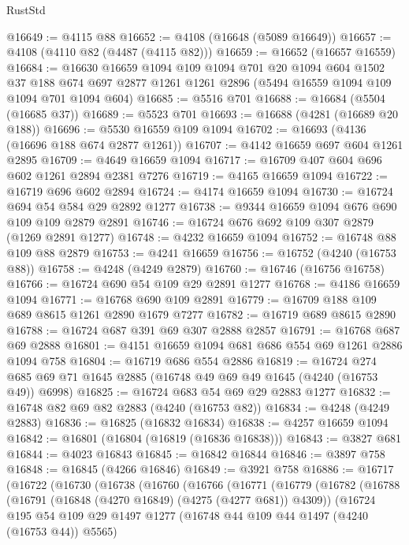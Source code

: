 \begin{lexlean}{RustStd}
\begin{coremodule}
@16649 := @4115 @88
@16652 := @4108 (@16648 (@5089 @16649))
@16657 := @4108 (@4110 @82 (@4487 (@4115 @82)))
@16659 := @16652 (@16657 @16559)
@16684 := @16630
    @16659
    @1094
    @109
    @1094
    @701
    @20
    @1094
    @604
    @1502
    @37
    @188
    @674
    @697
    @2877
    @1261
    @1261
    @2896
    (@5494 @16559 @1094 @109 @1094 @701 @1094 @604)
@16685 := @5516 @701
@16688 := @16684 (@5504 (@16685 @37))
@16689 := @5523 @701
@16693 := @16688 (@4281 (@16689 @20 @188))
@16696 := @5530 @16559 @109 @1094
@16702 := @16693 (@4136 (@16696 @188 @674 @2877 @1261))
@16707 := @4142 @16659 @697 @604 @1261 @2895
@16709 := @4649 @16659 @1094
@16717 := @16709 @407 @604 @696 @602 @1261 @2894 @2381 @7276
@16719 := @4165 @16659 @1094
@16722 := @16719 @696 @602 @2894
@16724 := @4174 @16659 @1094
@16730 := @16724 @694 @54 @584 @29 @2892 @1277
@16738 := @9344 @16659 @1094 @676 @690 @109 @109 @2879 @2891
@16746 := @16724 @676 @692 @109 @307 @2879 (@1269 @2891 @1277)
@16748 := @4232 @16659 @1094
@16752 := @16748 @88 @109 @88 @2879
@16753 := @4241 @16659
@16756 := @16752 (@4240 (@16753 @88))
@16758 := @4248 (@4249 @2879)
@16760 := @16746 (@16756 @16758)
@16766 := @16724 @690 @54 @109 @29 @2891 @1277
@16768 := @4186 @16659 @1094
@16771 := @16768 @690 @109 @2891
@16779 := @16709 @188 @109 @689 @8615 @1261 @2890 @1679 @7277
@16782 := @16719 @689 @8615 @2890
@16788 := @16724 @687 @391 @69 @307 @2888 @2857
@16791 := @16768 @687 @69 @2888
@16801 := @4151 @16659 @1094 @681 @686 @554 @69 @1261 @2886 @1094 @758
@16804 := @16719 @686 @554 @2886
@16819 := @16724 @274 @685 @69 @71 @1645 @2885 (@16748 @49 @69 @49 @1645 (@4240 (@16753 @49)) @6998)
@16825 := @16724 @683 @54 @69 @29 @2883 @1277
@16832 := @16748 @82 @69 @82 @2883 (@4240 (@16753 @82))
@16834 := @4248 (@4249 @2883)
@16836 := @16825 (@16832 @16834)
@16838 := @4257 @16659 @1094
@16842 := @16801 (@16804 (@16819 (@16836 @16838)))
@16843 := @3827 @681
@16844 := @4023 @16843
@16845 := @16842 @16844
@16846 := @3897 @758
@16848 := @16845 (@4266 @16846)
@16849 := @3921 @758
@16886 := @16717
    (@16722
      (@16730
        (@16738
          (@16760
            (@16766
              (@16771
                (@16779
                  (@16782
                    (@16788
                      (@16791 (@16848 (@4270 @16849) (@4275 (@4277 @681)) @4309))
                      (@16724
                        @195
                        @54
                        @109
                        @29
                        @1497
                        @1277
                        (@16748 @44 @109 @44 @1497 (@4240 (@16753 @44)) @5565)

\end{coremodule}
\end{lexlean}
